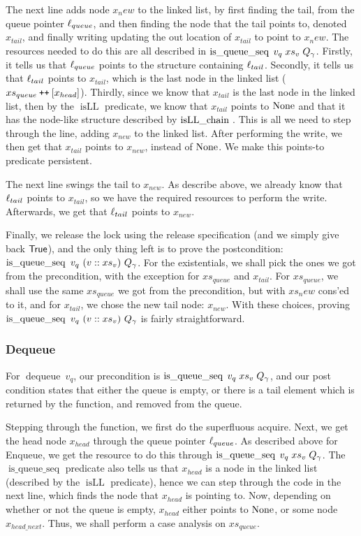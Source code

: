 \documentclass[twoside,11pt,openright]{report}
\newcommand{\dequeue}{\operatorname{dequeue}}
\newcommand{\isqueueseq}{\operatorname{is\_queue\_seq}}
\newcommand{\isLLchain}[1]{\operatorname{isLL\_chain} \; #1}
\newcommand{\isLL}{\operatorname{isLL}}
\newcommand\catenate{\mathbin{\text{\ttfamily\upshape ++}}}
\begin{document}
The next line adds node $x_new$ to the linked list, by first finding the tail, from the queue pointer $\ell_{queue}$, and then finding the node that the tail points to, denoted $x_{tail}$, and finally writing updating the out location of $x_{tail}$ to point to $x_new$. The resources needed to do this are all described in $\isqueueseq \; v_q \; xs_v \; Q_\gname$. Firstly, it tells us that $\ell_{queue}$ points to the structure containing $\ell_{tail}$. Secondly, it tells us that $\ell_{tail}$ points to $x_{tail}$, which is the last node in the linked list ($xs_{queue} \catenate [x_{head}]$). Thirdly, since we know that $x_{tail}$ is the last node in the linked list, then by the $\isLL$ predicate, we know that $x_{tail}$ points to $\operatorname{None}$ and that it has the node-like structure described by $\isLLchain$. This is all we need to step through the line, adding $x_{new}$ to the linked list. After performing the write, we then get that $x_{tail}$ points to $x_{new}$, instead of $\operatorname{None}$. We make this points-to predicate persistent.

The next line swings the tail to $x_{new}$. As describe above, we already know that $\ell_{tail}$ points to $x_{tail}$, so we have the required resources to perform the write. Afterwards, we get that $\ell_{tail}$ points to $x_{new}$.

Finally, we release the lock using the release specification (and we simply give back $\textsf{True}$), and the only thing left is to prove the postcondition: $\isqueueseq\ v_q\ (v :: xs_v)\ Q_\gname$. For the existentials, we shall pick the ones we got from the precondition, with the exception for $xs_{queue}$ and $x_{tail}$. For $xs_{queue}$, we shall use the same $xs_{queue}$ we got from the precondition, but with $xs_new$ cons'ed to it, and for $x_{tail}$, we chose the new tail node: $x_{new}$. With these choices, proving $\isqueueseq\ v_q\ (v :: xs_v)\ Q_\gname$ is fairly straightforward.

\subsubsection{Dequeue}

For $\dequeue\ v_q$, our precondition is $\isqueueseq \; v_q \; xs_v \; Q_\gname$, and our post condition states that either the queue is empty, or there is a tail element which is returned by the function, and removed from the queue.

Stepping through the function, we first do the superfluous acquire. Next, we get the head node $x_{head}$ through the queue pointer $\ell_{queue}$. As described above for Enqueue, we get the resource to do this through $\isqueueseq \; v_q \; xs_v \; Q_\gname$. The $\isqueueseq$ predicate also tells us that $x_{head}$ is a node in the linked list (described by the $\isLL$ predicate), hence we can step through the code in the next line, which finds the node that $x_{head}$ is pointing to. Now, depending on whether or not the queue is empty, $x_{head}$ either points to $\operatorname{None}$, or some node $x_{head\_next}$. Thus, we shall perform a case analysis on $xs_{queue}$.
\end{document}
